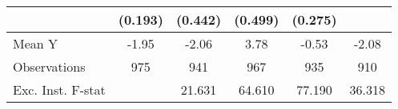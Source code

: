 {\begin{tabular}{l*{5}{c}}
            &     (0.193)         &     (0.442)         &     (0.499)         &     (0.275)         &                     \\
\midrule
Mean Y      &       -1.95         &       -2.06         &        3.78         &       -0.53         &       -2.08         \\
Observations&         975         &         941         &         967         &         935         &         910         \\
Exc. Inst. F-stat&                     &      21.631         &      64.610         &      77.190         &      36.318         \\
\bottomrule
\end{tabular}
}
